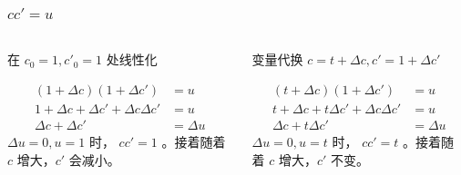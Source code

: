 \documentclass{beamer}
\begin{document}
\begin{frame}
\frametitle{$cc'=u$}
\label{sec-2-3}
\begin{columns}
\begin{column}{0.5\textwidth}
\begin{block}{在 $c_0=1,c'_0=1$ 处线性化}
\label{sec-2-3-1}


\begin{align*}
(1+\Delta c)(1+\Delta c') &= u \\
1+\Delta c+ \Delta c' + \Delta c \Delta c' &= u\\
\Delta c +\Delta c' &= \Delta u
\end{align*}
$\Delta u=0,u=1$ 时， $cc'=1$ 。接着随着 $c$ 增大，$c'$ 会减小。
\end{block}
\end{column}
\begin{column}{0.5\textwidth}
\begin{block}{变量代换 $c=t+\Delta c,c'=1+\Delta c'$}
\label{sec-2-3-2}

\begin{align*}
(t+\Delta c)(1+\Delta c') &=u \\
t+\Delta c+t\Delta c'+\Delta c\Delta c' &=u \\
\Delta c +t\Delta c' &= \Delta u
\end{align*}
$\Delta u=0,u=t$ 时， $cc'=t$ 。接着随着 $c$ 增大，$c'$ 不变。
\end{block}
\end{column}
\end{columns}
\end{frame}
\end{document}
